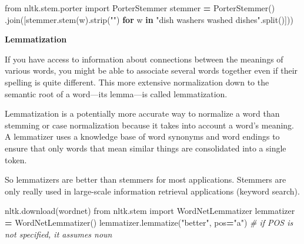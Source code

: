 \documentclass[
]{book}
\newenvironment{Shaded}{\begin{snugshade}}{\end{snugshade}}
\newcommand{\CommentTok}[1]{\textcolor[rgb]{0.56,0.35,0.01}{\textit{#1}}}
\newcommand{\ControlFlowTok}[1]{\textcolor[rgb]{0.13,0.29,0.53}{\textbf{#1}}}
\newcommand{\ImportTok}[1]{#1}
\newcommand{\KeywordTok}[1]{\textcolor[rgb]{0.13,0.29,0.53}{\textbf{#1}}}
\newcommand{\NormalTok}[1]{#1}
\newcommand{\OperatorTok}[1]{\textcolor[rgb]{0.81,0.36,0.00}{\textbf{#1}}}
\newcommand{\StringTok}[1]{\textcolor[rgb]{0.31,0.60,0.02}{#1}}
\begin{document}
\begin{Shaded}
\begin{Highlighting}[]
\ImportTok{from}\NormalTok{ nltk.stem.porter}
\ImportTok{import}\NormalTok{ PorterStemmer}
\NormalTok{stemmer }\OperatorTok{=}\NormalTok{ PorterStemmer()}
\CommentTok{\textquotesingle{} \textquotesingle{}}\NormalTok{.join([stemmer.stem(w).strip(}\StringTok{"\textquotesingle{}"}\NormalTok{) }\ControlFlowTok{for}\NormalTok{ w }\KeywordTok{in} \StringTok{"dish washer\textquotesingle{}s washed dishes"}\NormalTok{.split()]))}
\end{Highlighting}
\end{Shaded}

\textbf{Lemmatization}

If you have access to information about connections between the meanings of various words, you might be able to associate several words together even if their spelling is quite different. This more extensive normalization down to the semantic root of a word---its lemma---is called lemmatization.

Lemmatization is a potentially more accurate way to normalize a word than stemming or case normalization because it takes into account a word's meaning. A lemmatizer uses a knowledge base of word synonyms and word endings to ensure that only words that mean similar things are consolidated into a single token.

So lemmatizers are better than stemmers for most applications. Stemmers are only really used in large-scale information retrieval applications (keyword search).

\begin{Shaded}
\begin{Highlighting}[]
\NormalTok{nltk.download(}\StringTok{\textquotesingle{}wordnet\textquotesingle{}}\NormalTok{)}
\ImportTok{from}\NormalTok{ nltk.stem }\ImportTok{import}\NormalTok{ WordNetLemmatizer}
\NormalTok{lemmatizer }\OperatorTok{=}\NormalTok{ WordNetLemmatizer()}
\NormalTok{lemmatizer.lemmatize(}\StringTok{"better"}\NormalTok{, pos}\OperatorTok{=}\StringTok{"a"}\NormalTok{) }\CommentTok{\# if POS is not specified, it assumes noun}
\end{Highlighting}
\end{Shaded}


  
\end{document}

